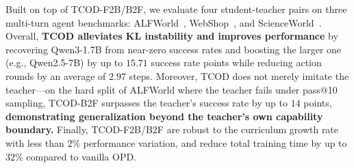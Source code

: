\documentclass{article} %
\newcommand{\ours}{TCOD\xspace}
\begin{document}
Built on top of \ours-F2B/B2F, we evaluate four student-teacher pairs on three multi-turn agent benchmarks: ALFWorld~\citep{shridhar2020alfworld}, 
WebShop~\citep{yao2022webshop}, and ScienceWorld~\citep{wang2022scienceworld}. 
Overall, \textbf{\ours alleviates KL instability and improves performance} by recovering Qwen3-1.7B from near-zero success rates and boosting the larger one (e.g., Qwen2.5-7B) by up to $15.71$ success rate points while reducing action rounds by an average of $2.97$ steps. 
Moreover, \ours does not merely imitate the teacher---on the hard split of ALFWorld where the teacher fails under pass@10 sampling, \ours-B2F surpasses 
the teacher's success rate by up to $14$ points, \textbf{demonstrating generalization beyond the teacher's own capability boundary.} 
Finally, \ours-F2B/B2F are robust to the curriculum growth rate with less than $2\%$ performance variation, and reduce total training time by up to $32\%$ compared to vanilla OPD.











\end{document}
